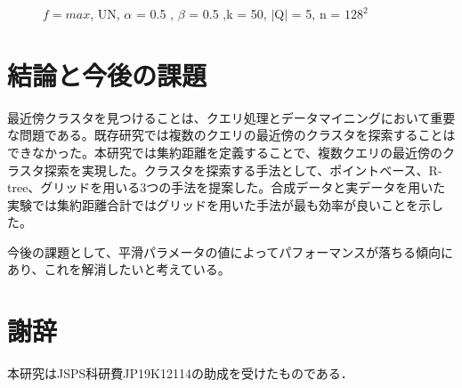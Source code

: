 \documentclass{deimj}
\theoremstyle{definition}
\begin{document}
\begin{figure}[H]
	\centering
    \caption{$f=max$, UN, $\alpha$ = 0.5 , $\beta$ = 0.5 ,k = 50, $\mid$Q$\mid$ = 5, n = $128^2$}
    \label{fig:max-dataSize}
\end{figure}

\section{結論と今後の課題}
最近傍クラスタを見つけることは、クエリ処理とデータマイニングにおいて重要な問題である。既存研究では複数のクエリの最近傍のクラスタを探索することはできなかった。本研究では集約距離を定義することで、複数クエリの最近傍のクラスタ探索を実現した。クラスタを探索する手法として、ポイントベース、R-tree、グリッドを用いる3つの手法を提案した。合成データと実データを用いた実験では集約距離合計ではグリッドを用いた手法が最も効率が良いことを示した。

今後の課題として、平滑パラメータの値によってパフォーマンスが落ちる傾向にあり、これを解消したいと考えている。

\section*{謝辞}
本研究はJSPS科研費JP19K12114の助成を受けたものである．

\vspace{2em}

\end{document}
